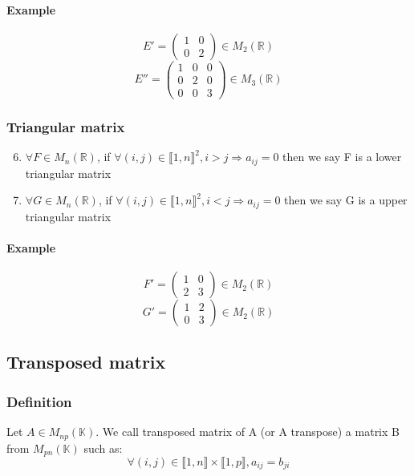 \documentclass[notitlepage]{math}
\begin{document}
    \paragraph{Example}
    \[ E' = \begin{pmatrix}
        1 & 0 \\
        0 & 2
    \end{pmatrix} \in M_{2}(\mathbb{R})\]
    \[ E'' = \begin{pmatrix}
        1 & 0 & 0 \\
        0 & 2 & 0 \\
        0 & 0 & 3
    \end{pmatrix} \in M_{3}(\mathbb{R})\]

\subsubsection{Triangular matrix}
    \begin{enumerate}
        \setcounter{enumi}{5}
        \item $\forall F \in M_{n}(\mathbb{R})$, if $\forall (i,j) \in \llbracket 1,n \rrbracket ^2, i > j \Rightarrow a_{ij} = 0$ then we say F is a lower triangular matrix
        \item $\forall G \in M_{n}(\mathbb{R})$, if $\forall (i,j) \in \llbracket 1,n \rrbracket ^2, i < j \Rightarrow a_{ij} = 0$ then we say G is a upper triangular matrix
    \end{enumerate}
    \paragraph{Example}
    \[ F' = \begin{pmatrix}
        1 & 0 \\
        2 & 3
    \end{pmatrix} \in M_{2}(\mathbb{R})\]
    \[ G' = \begin{pmatrix}
        1 & 2 \\
        0 & 3
    \end{pmatrix} \in M_{2}(\mathbb{R})\]

\subsection{Transposed matrix}
    \subsubsection{Definition}
        Let $A \in M_{np}(\mathbb{K})$. We call transposed matrix of A (or A transpose) a matrix B from $M_{pn}(\mathbb{K})$ such as:
        \[ \forall (i,j) \in \llbracket 1,n \rrbracket \times \llbracket 1,p \rrbracket, a_{ij} = b_{ji}\]
\end{document}
